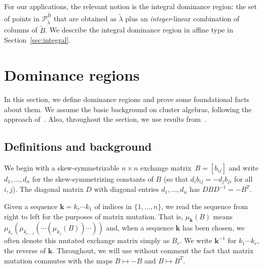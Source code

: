 \documentclass{amsart}
\theoremstyle{definition}
\theoremstyle{remark}
\numberwithin{equation}{section}
\newcommand{\set}[1]{{\lbrace #1 \rbrace}}
\newcommand{\0}{{\mathbf{0}}}
\newcommand{\kk}{{\boldsymbol{k}}}
\newcommand{\tB}{{\widetilde{B}}}
\renewcommand{\P}{\mathcal{P}}
\newcommand{\symmetrizer}{{D}}
\begin{document}
For our applications, the relevant notion is the integral dominance region: the set of points in $\P_{\tilde\lambda}^\tB$ that are obtained as $\tilde\lambda$ plus an \emph{integer}-linear combination of columns of $\tB$.
We describe the integral dominance region in affine type in Section~\ref{sec:integral}.

\section{Dominance regions}
In this section, we define dominance regions and prove some foundational facts about them.
We assume the basic background on cluster algebras, following the approach of~\cite{ca4}.
Also, throughout the section, we use results from~\cite{NZ}.


\subsection{Definitions and background}\label{def sec}
We begin with a skew-symmetrizable $n \times n$ exchange matrix~$B=[b_{ij}]$ and write $d_1,\ldots,d_n$ for the skew-symmetrizing constants of $B$ (so that $d_i b_{ij}=-d_j b_{ji}$ for all $i,j$).
The diagonal matrix $\symmetrizer$ with diagonal entries $d_1,\ldots,d_n$ has $\symmetrizer B\symmetrizer^{-1}=-B^T$.

Given a sequence $\kk=k_r\cdots k_1$ of indices in $\set{1,\ldots,n}$, we read the sequence from right to left for the purposes of matrix mutation.
That is, $\mu_\kk(B)$ means $\mu_{k_r}(\mu_{k_{r-1}}(\cdots(\mu_{k_1}(B))\cdots))$ and, when a sequence $\kk$ has been chosen, we often denote this mutated exchange matrix simply as $B_r$.
We write $\kk^{-1}$ for $k_1\cdots k_r$, the reverse of $\kk$.
Throughout, we will use without comment the fact that matrix mutation commutes with the maps $B\mapsto-B$ and $B\mapsto B^T$.
\end{document}
